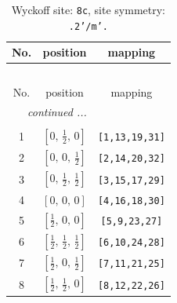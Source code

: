 \documentclass[fleqn,8pt]{jsarticle}
\begin{document}
\begin{longtable}{ccc}
\caption{Wyckoff site: {\tt 8c}, site symmetry: {\tt .2'/m'.}}
 \\
 \hline \hline
No. & position & mapping \\ \hline \endfirsthead

\multicolumn{2}{l}{\tablename\ \thetable{}} \\
 \hline \hline
No. & position & mapping \\ \hline \endhead

 \hline \hline
\multicolumn{2}{r}{\footnotesize\it continued ...} \\ \endfoot

 \hline \hline
\multicolumn{2}{r}{} \\ \endlastfoot

1 & $\left[ 0,\, \frac{1}{2},\, 0 \right]$ & {\tt [1,13,19,31]} \\ \hline
2 & $\left[ 0,\, 0,\, \frac{1}{2} \right]$ & {\tt [2,14,20,32]} \\ \hline
3 & $\left[ 0,\, \frac{1}{2},\, \frac{1}{2} \right]$ & {\tt [3,15,17,29]} \\ \hline
4 & $\left[ 0,\, 0,\, 0 \right]$ & {\tt [4,16,18,30]} \\ \hline
5 & $\left[ \frac{1}{2},\, 0,\, 0 \right]$ & {\tt [5,9,23,27]} \\ \hline
6 & $\left[ \frac{1}{2},\, \frac{1}{2},\, \frac{1}{2} \right]$ & {\tt [6,10,24,28]} \\ \hline
7 & $\left[ \frac{1}{2},\, 0,\, \frac{1}{2} \right]$ & {\tt [7,11,21,25]} \\ \hline
8 & $\left[ \frac{1}{2},\, \frac{1}{2},\, 0 \right]$ & {\tt [8,12,22,26]} \\
\end{longtable}
\renewcommand{\arraystretch}{1.2}
\end{document}
